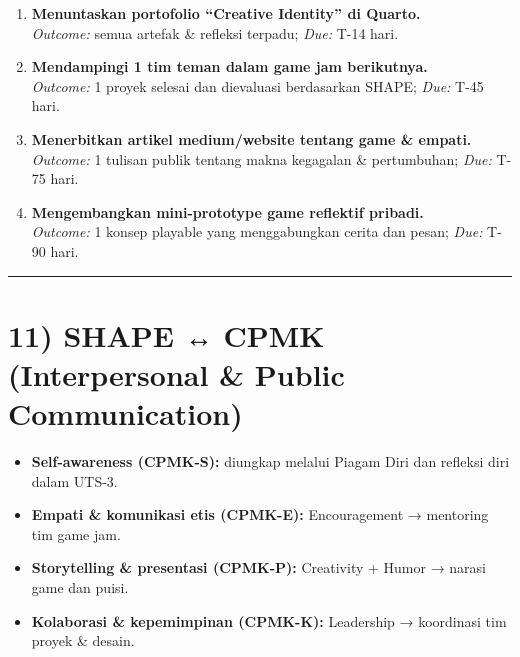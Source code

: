 \documentclass[
  letterpaper,
  DIV=11,
  numbers=noendperiod]{scrreprt}
\providecommand{\tightlist}{%
  \setlength{\itemsep}{0pt}\setlength{\parskip}{0pt}}
\begin{document}
\begin{enumerate}
\def\labelenumi{\arabic{enumi}.}
\tightlist
\item
  \textbf{Menuntaskan portofolio ``Creative Identity'' di Quarto.}\\
  \emph{Outcome:} semua artefak \& refleksi terpadu; \emph{Due:} T-14
  hari.\\
\item
  \textbf{Mendampingi 1 tim teman dalam game jam berikutnya.}\\
  \emph{Outcome:} 1 proyek selesai dan dievaluasi berdasarkan SHAPE;
  \emph{Due:} T-45 hari.\\
\item
  \textbf{Menerbitkan artikel medium/website tentang game \& empati.}\\
  \emph{Outcome:} 1 tulisan publik tentang makna kegagalan \&
  pertumbuhan; \emph{Due:} T-75 hari.\\
\item
  \textbf{Mengembangkan mini-prototype game reflektif pribadi.}\\
  \emph{Outcome:} 1 konsep playable yang menggabungkan cerita dan pesan;
  \emph{Due:} T-90 hari.
\end{enumerate}

\begin{center}\rule{0.5\linewidth}{0.5pt}\end{center}

\section{11) SHAPE ↔ CPMK (Interpersonal \& Public
Communication)}\label{shape-cpmk-interpersonal-public-communication}

\begin{itemize}
\tightlist
\item
  \textbf{Self-awareness (CPMK-S):} diungkap melalui Piagam Diri dan
  refleksi diri dalam UTS-3.\\
\item
  \textbf{Empati \& komunikasi etis (CPMK-E):} Encouragement → mentoring
  tim game jam.\\
\item
  \textbf{Storytelling \& presentasi (CPMK-P):} Creativity + Humor →
  narasi game dan puisi.\\
\item
  \textbf{Kolaborasi \& kepemimpinan (CPMK-K):} Leadership → koordinasi
  tim proyek \& desain.
\end{itemize}
\end{document}
